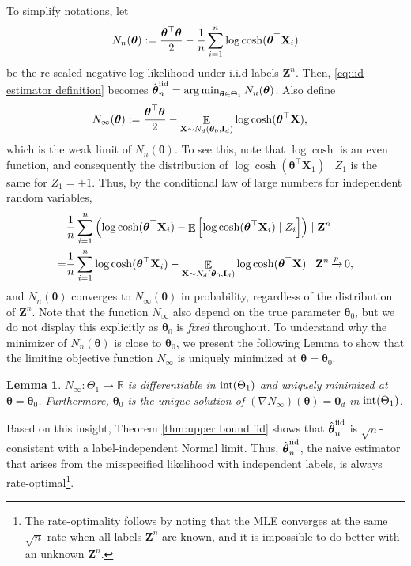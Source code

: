 \documentclass[preprint,reqno]{imsart}
\newtheorem{lemma}[thm]{Lemma}
\newcommand{\ttheta}{\boldsymbol{\theta}}
\newcommand{\I}{\mathbf{I}_{\mathnormal{d}}}
\DeclareMathOperator{\xp}{\xrightarrow{\mathnormal p}}
\DeclareMathOperator{\EE}{\mathbb{E}}
\newcommand{\Z}{\mathbf{Z}}
\newcommand{\X}{\mathbf{X}}
\DeclareMathOperator{\sumin}{\sum_{\mathnormal i=1}^{\mathnormal n}}
\newcommand{\thetaiid}{\hat{\boldsymbol \theta}^{\text{iid}}_{\mathnormal n}}
\DeclareMathOperator*{\argmin}{arg\,min}
\begin{document}
To simplify notations, let 
$$N_n(\ttheta) := \frac{\ttheta^\top \ttheta}{2} - \frac{1}{n} \sumin \log \cosh( \ttheta^\top \X_i)$$
be the re-scaled negative log-likelihood under i.i.d labels $\Z^n$. Then, \eqref{eq:iid estimator definition} becomes $\thetaiid = \argmin_{\ttheta\in \Theta_1} N_n(\ttheta)$.
Also define
\begin{align*}
    N_{\infty}(\ttheta) &:= \frac{\ttheta^\top \ttheta}{2} - \EE_{\X\sim N_d(\ttheta_0, \I)} \log \cosh( \ttheta^\top \X),
\end{align*}
which is the weak limit of $N_{n}(\ttheta)$.
To see this, note that $\log \cosh$ is an even function, and consequently the distribution of $\log \cosh (\ttheta^\top \X_1) \mid Z_1$
%
%
%
is the same for $Z_1 = \pm 1$. Thus, by the conditional law of large numbers for independent random variables, 
\begin{align*}
    &\frac{1}{n} \sumin \left(\log \cosh(\ttheta^\top \X_i) - \EE\left[\log \cosh(\ttheta^\top \X_i) \mid Z_i \right] \right) \mid \Z^n \\
    =& \frac{1}{n} \sumin \log \cosh(\ttheta^\top \X_i) - \EE_{\X\sim N_d(\ttheta_0, \I)} \log \cosh(\ttheta^\top \X) \mid \Z^n \xp 0,
\end{align*}
and $N_n(\ttheta)$ converges to $N_{\infty}(\ttheta)$ in probability, regardless of the distribution of $\Z^n$. Note that the function $N_{\infty}$ also depend on the true parameter $\ttheta_0$, but we do not display this explicitly as $\ttheta_0$ is \emph{fixed} throughout. To understand why the minimizer of $N_n(\ttheta)$ is close to $\ttheta_0$, we present  the following Lemma to show that the limiting objective function $N_{\infty}$ is uniquely minimized at $\ttheta= \ttheta_0$. 
%


\begin{lemma}\label{lem:uniqueness iid}
    $N_{\infty}:\Theta_1 \to \mathbb R$ is differentiable in $\textnormal{int}(\Theta_1)$ and uniquely minimized at $\ttheta= \ttheta_0$. Furthermore, $\ttheta_0$ is the unique solution of $(\nabla N_{\infty})(\ttheta) = \mathbf{0}_d$ in $\textnormal{int}(\Theta_1)$.
\end{lemma}

Based on this insight, Theorem \ref{thm:upper bound iid} shows that $\thetaiid$ is $\sqrt{n}$-consistent with a label-independent Normal limit. Thus, $\thetaiid$, the naive estimator that arises from the misspecified likelihood with independent labels, is always rate-optimal\footnote{The rate-optimality follows by noting that the MLE converges at the same $\sqrt{n}$-rate when all labels $\Z^n$ are known, and it is impossible to do better with an unknown $\Z^n$.}.
%
\end{document}
